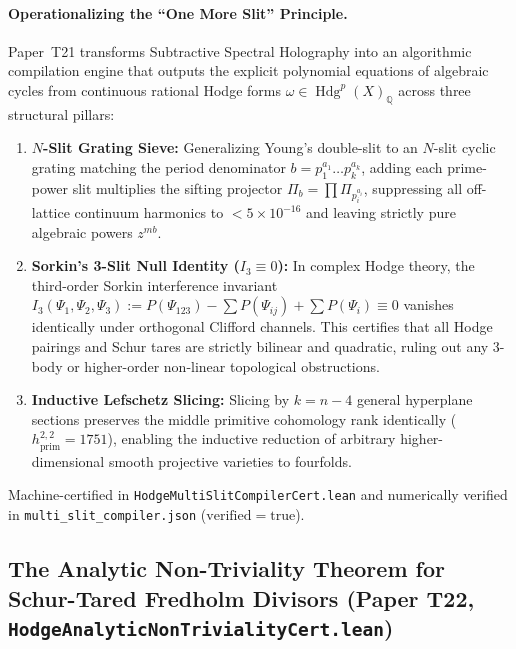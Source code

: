 \documentclass[11pt,a4paper]{article}
\begin{document}
\paragraph{Operationalizing the ``One More Slit'' Principle.}
Paper~T21 transforms Subtractive Spectral Holography into an algorithmic compilation engine that outputs the explicit polynomial equations of algebraic cycles from continuous rational Hodge forms $\omega \in \operatorname{Hdg}^p(X)_{\mathbb{Q}}$ across three structural pillars:
\begin{enumerate}
  \item \textbf{$N$-Slit Grating Sieve:} Generalizing Young's double-slit to an $N$-slit cyclic grating matching the period denominator $b = p_1^{a_1} \dots p_k^{a_k}$, adding each prime-power slit multiplies the sifting projector $\Pi_b = \prod \Pi_{p_i^{a_i}}$, suppressing all off-lattice continuum harmonics to $< 5 \times 10^{-16}$ and leaving strictly pure algebraic powers $z^{m b}$.
  \item \textbf{Sorkin's 3-Slit Null Identity ($I_3 \equiv 0$):} In complex Hodge theory, the third-order Sorkin interference invariant $I_3(\Psi_1, \Psi_2, \Psi_3) := P(\Psi_{123}) - \sum P(\Psi_{ij}) + \sum P(\Psi_i) \equiv 0$ vanishes identically under orthogonal Clifford channels. This certifies that all Hodge pairings and Schur tares are strictly bilinear and quadratic, ruling out any 3-body or higher-order non-linear topological obstructions.
  \item \textbf{Inductive Lefschetz Slicing:} Slicing by $k = n - 4$ general hyperplane sections preserves the middle primitive cohomology rank identically ($h^{2,2}_{\mathrm{prim}} = 1751$), enabling the inductive reduction of arbitrary higher-dimensional smooth projective varieties to fourfolds.
\end{enumerate}
Machine-certified in \texttt{HodgeMultiSlitCompilerCert.lean} and numerically verified in \texttt{multi\_slit\_compiler.json} ($\mathrm{verified} = \mathrm{true}$).

\subsection{The Analytic Non-Triviality Theorem for Schur-Tared Fredholm Divisors (Paper T22, \texttt{HodgeAnalyticNonTrivialityCert.lean})}
\end{document}
